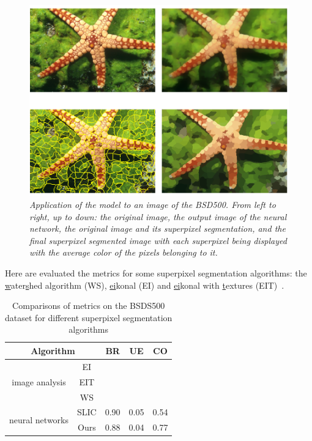 \documentclass{article}
\begin{document}
        \begin{figure}[!htb]
            \centering
            \includegraphics[width=.8\linewidth]{pics/img_bsd_res2.png}
            \caption{\textit{Application of the model to an image of the BSD500. From left to right, up to down: the original image, the output image of the neural network, the original image and its superpixel segmentation\cite{groundtruthornot}, and the final superpixel segmented image with each superpixel being displayed with the average color of the pixels belonging to it.}}
        \end{figure}
        \cite{checkplacement}
        Here are evaluated the metrics for some superpixel segmentation algorithms: the \underline{w}ater\underline{s}hed algorithm (WS), \underline{ei}konal (EI) and \underline{ei}konal with \underline{t}extures (EIT)~\cite{figliuzzi2019}.
        \cite{todo:metrics}
        \begin{table}[!ht]
            \centering
            \begin{tabular}{|c|c|ccc|}
                \hline
                \multicolumn{2}{|c|}{Algorithm} & BR & UE & CO\\
                \hline
                \hline
                \multirow{3}{*}{image analysis} & EI & & & \\
                                                & EIT & & & \\
                                                & WS & & & \\
                \hline
                \multirow{2}{*}{neural networks} & SLIC & 0.90 & 0.05 & 0.54\\
                                                 & Ours & 0.88 & 0.04 & 0.77\\
                \hline
            \end{tabular}
            \caption{Comparisons of metrics on the BSDS500 dataset for different superpixel segmentation algorithms}
        \end{table}
\end{document}
